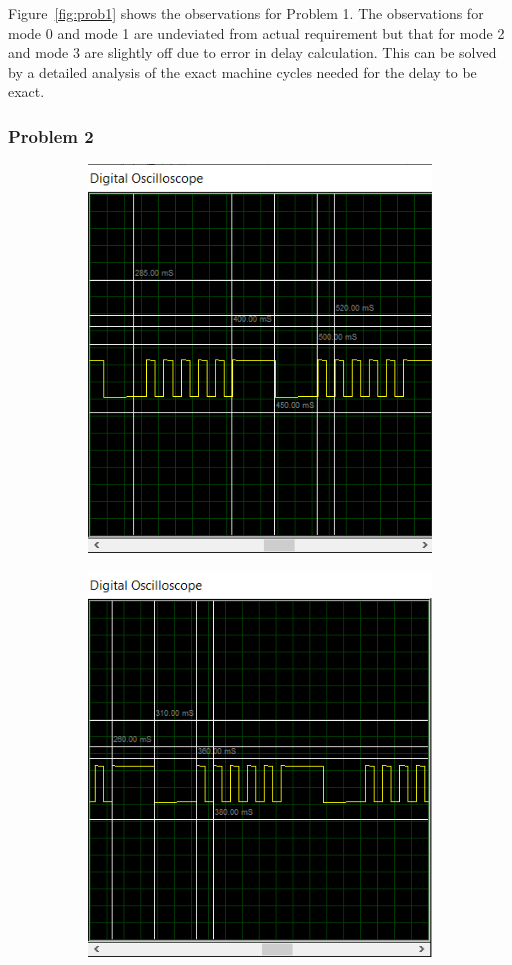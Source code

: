 \documentclass{lab_sheet}
\begin{document}
    Figure~\ref{fig:prob1} shows the observations for Problem 1. The observations for mode 0 and mode 1 are undeviated from actual requirement but that for mode 2 and mode 3 are slightly off due to error in delay calculation. This can be solved by a detailed analysis of the exact machine cycles needed for the delay to be exact.
    \subsubsection*{Problem 2}
    \begin{figure}[H]
        \begin{subfigure}{.5\textwidth}
        \centering
        \includegraphics[width=.8\linewidth,frame]{../Figures/2a.png}
        \caption{}
        \label{fig:prob2_a}
        \end{subfigure}
        \begin{subfigure}{.5\textwidth}
            \centering
            \includegraphics[width=.8\linewidth,frame]{../Figures/2b.png}

\end{subfigure}
\end{figure}
\end{document}
